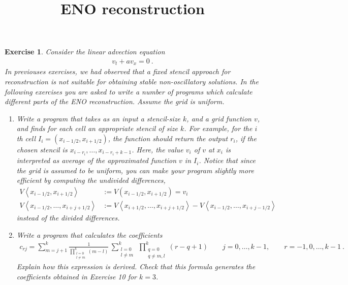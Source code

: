 \documentclass[10pt,letterpaper]{article}
\newcommand{\ol}{} %
\newcommand{\rb}[1]{ \left(  {#1} \right) }
\newcommand{\sqb}[1]{ \left(  {#1} \right) }
\newcommand{\angb}[1]{ \left\langle  {#1} \right\rangle }
\theoremstyle{break}
\newtheorem{exercise}{Exercise}
\begin{document}
\title{ENO reconstruction}
\date{}

\maketitle


\begin{exercise}
	Consider the linear advection equation
	\begin{gather} \label{linadv}
		v_t + a v_x = 0\ .
	\end{gather}%
	In previouses exercises, we had observed that a fixed stencil approach for reconstruction is not suitable for obtaining stable non-oscillatory solutions. 
	In the following exercises you are asked to write a number of programs which calculate different parts of the ENO reconstruction. 
	Assume the grid is uniform. 
	\begin{enumerate}
		\item
		Write a program that takes as an input a stencil-size $k$, and a grid function $\ol v$, and finds for each cell an appropriate stencil of size $k$. 
		For example, for the $i$th cell $I_i=(x_{i-1/2},  x_{i+1/2})$, the function should return the output $r_i$, 
		if the chosen stencil is $x_{i-r_i},\ldots,x_{i-r_i+k-1}$. 
		Here, the value $\ol v_i$ of $\ol v$ at $x_i$ is interpreted as average of the approximated function $v$ in $I_i$. 
		Notice that since the grid is assumed to be uniform, 
		you can make your program slightly more efficient by computing the {\it undivided differences},
		\begin{align}
			V\!\angb{x_{i-1/2},x_{i+1/2}}& :=V\!\sqb{x_{i-1/2},x_{i+1/2}} =\ol v_i\\[0.5em]
			V\!\angb{x_{i-1/2},\ldots,x_{i+j+1/2}} &:=
				V\!\angb{x_{i+1/2},\ldots,x_{i+j+1/2}}
				-V\!\angb{x_{i-1/2},\ldots,x_{i+j-1/2}}
		\end{align}
		instead of the divided differences.
		\item
		Write a program that calculates the coefficients
		\begin{gather}%
			c_{rj}=\sum_{m=j+1}^k
				\frac{1}{\prod_{\substack{l=0 \\l\ne m}}^k\rb{m-l}}\,
					\sum_{\substack{l=0\\l\ne m}}^k\,
					\prod_{\substack{q=0\\q\ne m,l}}^k\rb{r-q+1}
				\qquad
				j=0,\ldots,k-1, \qquad r=-1,0,\ldots,k-1\ .
		\end{gather}%
		Explain how this expression is derived. 
		Check that this formula generates the coefficients obtained in Exercise 10 for $k=3$.
		

\end{enumerate}
\end{exercise}
\end{document}
